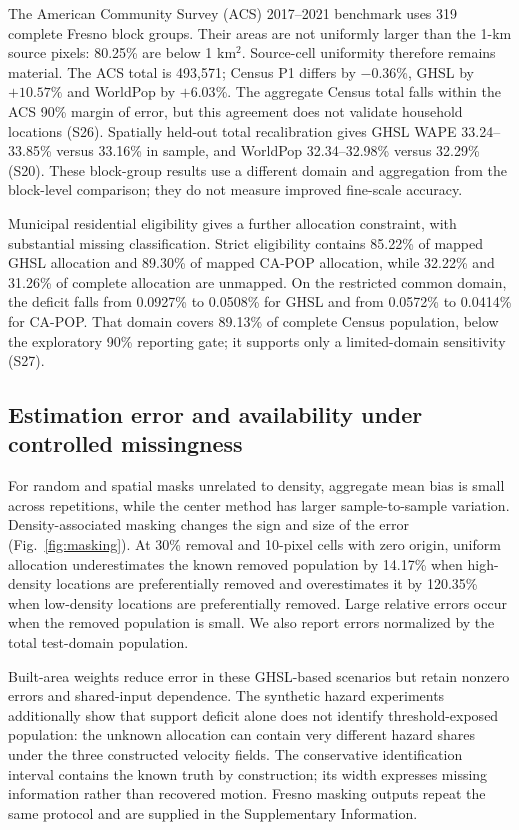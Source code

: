\documentclass[pdflatex,sn-nature]{sn-jnl}
\begin{document}
The American Community Survey (ACS) 2017--2021 benchmark uses 319 complete Fresno block groups. Their areas are not uniformly larger than the 1-km source pixels: 80.25\% are below 1 km$^2$. Source-cell uniformity therefore remains material. The ACS total is 493,571; Census P1 differs by $-0.36\%$, GHSL by $+10.57\%$ and WorldPop by $+6.03\%$. The aggregate Census total falls within the ACS 90\% margin of error, but this agreement does not validate household locations (S26). Spatially held-out total recalibration gives GHSL WAPE 33.24--33.85\% versus 33.16\% in sample, and WorldPop 32.34--32.98\% versus 32.29\% (S20). These block-group results use a different domain and aggregation from the block-level comparison; they do not measure improved fine-scale accuracy.

Municipal residential eligibility gives a further allocation constraint, with substantial missing classification. Strict eligibility contains 85.22\% of mapped GHSL allocation and 89.30\% of mapped CA-POP allocation, while 32.22\% and 31.26\% of complete allocation are unmapped. On the restricted common domain, the deficit falls from 0.0927\% to 0.0508\% for GHSL and from 0.0572\% to 0.0414\% for CA-POP. That domain covers 89.13\% of complete Census population, below the exploratory 90\% reporting gate; it supports only a limited-domain sensitivity (S27).

\subsection{Estimation error and availability under controlled missingness}
For random and spatial masks unrelated to density, aggregate mean bias is small across repetitions, while the center method has larger sample-to-sample variation. Density-associated masking changes the sign and size of the error (Fig.~\ref{fig:masking}). At 30\% removal and 10-pixel cells with zero origin, uniform allocation underestimates the known removed population by 14.17\% when high-density locations are preferentially removed and overestimates it by 120.35\% when low-density locations are preferentially removed. Large relative errors occur when the removed population is small. We also report errors normalized by the total test-domain population.

Built-area weights reduce error in these GHSL-based scenarios but retain nonzero errors and shared-input dependence. The synthetic hazard experiments additionally show that support deficit alone does not identify threshold-exposed population: the unknown allocation can contain very different hazard shares under the three constructed velocity fields. The conservative identification interval contains the known truth by construction; its width expresses missing information rather than recovered motion. Fresno masking outputs repeat the same protocol and are supplied in the Supplementary Information.
\end{document}
